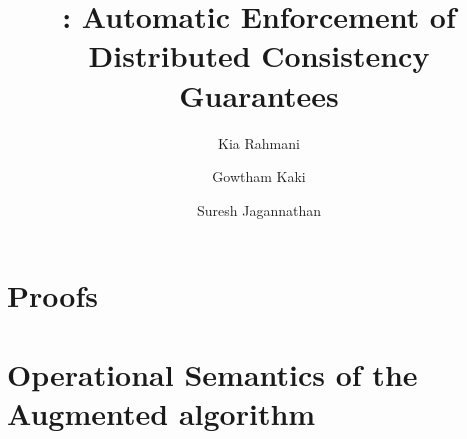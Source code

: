 \documentclass{llncs}
\begin{document}
%
\frontmatter          %
%

%
\pagestyle{headings}  %
%
%
\mainmatter              %
%
\title{\tool : Automatic Enforcement of Distributed Consistency Guarantees}
%
%
\author{Kia Rahmani \and Gowtham Kaki\and Suresh
Jagannathan}
%
%
%
\maketitle              %

\begin{abstract}

\end{abstract}


















%
%
\nocite{*}




\appendix
\newpage
\section{Proofs}
\label{appendix:proofs}


\newpage
\section{Operational Semantics of the Augmented algorithm}
\label{appendix:large_semantics}

\end{document}
